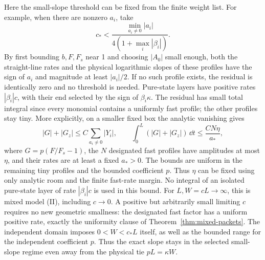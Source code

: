 Here the small-slope threshold can be fixed from the finite weight list.
For example, when there are nonzero \(a_i\), take
\[
 c_*<\frac{\min_{a_i\ne0}|a_i|}
                 {4(1+\max_i|\beta_i|)}.
\]
By first bounding \(b,F,F_s\) near 1 and choosing \(|A_0|\) small enough,
both the straight-line rates and the physical logarithmic slopes of these
profiles have the sign of \(a_i\) and magnitude at least
\(|a_i|/2\).  If no such profile exists, the residual is identically zero
and no threshold is needed.  Pure-state layers have positive rates
\(|\beta_i|c\), with their end selected by the sign of
\(\beta_i\kappa\).  The residual has small total integral since every
monomial contains a uniformly fast profile; the other profiles stay tiny.
More explicitly, on a smaller fixed box the analytic vanishing gives
\[
 |G|+|G_z|\le C\sum_{a_i\ne0}|Y_i|,
 \qquad
 \int_0^L(|G|+|G_z|)\,\dd t
 \le \frac{CN\eta}{a_*},
\]
where \(G=p(F/F_s-1)\), the \(N\) designated fast profiles have amplitudes
at most \(\eta\), and their rates are at least a fixed \(a_*>0\).
The bounds are uniform in the remaining tiny profiles and the bounded
coefficient \(p\).  Thus \(\eta\) can be fixed using only analytic room
and the finite fast-rate margin.  No integral of an isolated pure-state
layer of rate \(|\beta_i|c\) is used in this bound.
For \(L,W=cL\to\infty\), this is mixed model (II), including
\(c\to0\).  A positive but arbitrarily small limiting \(c\) requires
no new geometric smallness: the designated fast factor has a uniform
positive rate, exactly the uniformity clause of
Theorem~\ref{thm:mixed-packets}.
The independent domain imposes \(0<W<c_*L\) itself, as well as the
bounded range for the independent coefficient \(p\).  Thus the exact
slope stays in the selected small-slope regime even away from the
physical tie \(pL=\kappa W\).

